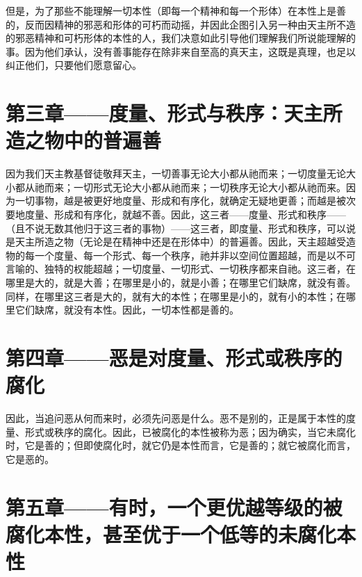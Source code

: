 但是，为了那些不能理解一切本性（即每一个精神和每一个形体）在本性上是善的，反而因精神的邪恶和形体的可朽而动摇，并因此企图引入另一种由天主所不造的邪恶精神和可朽形体的本性的人，我们决意如此引导他们理解我们所说能理解的事。因为他们承认，没有善事能存在除非来自至高的真天主，这既是真理，也足以纠正他们，只要他们愿意留心。\par


\section{第三章——度量、形式与秩序：天主所造之物中的普遍善}

因为我们天主教基督徒敬拜天主，一切善事无论大小都从祂而来；一切度量无论大小都从祂而来；一切形式无论大小都从祂而来；一切秩序无论大小都从祂而来。因为一切事物，越是被更好地度量、形成和有序化，就确定无疑地更善；而越是被次要地度量、形成和有序化，就越不善。因此，这三者——度量、形式和秩序——（且不说无数其他归于这三者的事物）——这三者，即度量、形式和秩序，可以说是天主所造之物（无论是在精神中还是在形体中）的普遍善。因此，天主超越受造物的每一个度量、每一个形式、每一个秩序，祂并非以空间位置超越，而是以不可言喻的、独特的权能超越；一切度量、一切形式、一切秩序都来自祂。这三者，在哪里是大的，就是大善；在哪里是小的，就是小善；在哪里它们缺席，就没有善。同样，在哪里这三者是大的，就有大的本性；在哪里是小的，就有小的本性；在哪里它们缺席，就没有本性。因此，一切本性都是善的。\par


\section{第四章——恶是对度量、形式或秩序的腐化}

因此，当追问恶从何而来时，必须先问恶是什么。恶不是别的，正是属于本性的度量、形式或秩序的腐化。因此，已被腐化的本性被称为恶；因为确实，当它未腐化时，它是善的；但即使腐化时，就它仍是本性而言，它是善的；就它被腐化而言，它是恶的。\par


\section{第五章——有时，一个更优越等级的被腐化本性，甚至优于一个低等的未腐化本性}

